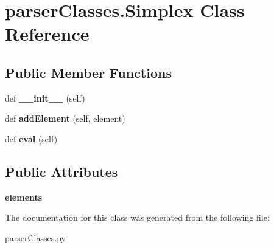\hypertarget{classparser_classes_1_1_simplex}{}\section{parser\+Classes.\+Simplex Class Reference}
\label{classparser_classes_1_1_simplex}
\subsection*{Public Member Functions}
\begin{DoxyCompactItemize}
\item 
def {\bfseries \+\_\+\+\_\+init\+\_\+\+\_\+} (self)\hypertarget{classparser_classes_1_1_simplex_ae0d244c9cd73a6ccb9fe38a5e2045818}{}\label{classparser_classes_1_1_simplex_ae0d244c9cd73a6ccb9fe38a5e2045818}

\item 
def {\bfseries add\+Element} (self, element)\hypertarget{classparser_classes_1_1_simplex_ab4f047be45ac43f11b9fb18691ca1413}{}\label{classparser_classes_1_1_simplex_ab4f047be45ac43f11b9fb18691ca1413}

\item 
def {\bfseries eval} (self)\hypertarget{classparser_classes_1_1_simplex_adbbb7c22025953fc0690e4bcd22ce4cc}{}\label{classparser_classes_1_1_simplex_adbbb7c22025953fc0690e4bcd22ce4cc}

\end{DoxyCompactItemize}
\subsection*{Public Attributes}
\begin{DoxyCompactItemize}
\item 
{\bfseries elements}\hypertarget{classparser_classes_1_1_simplex_a20765598c2e5bc570cc0ea135920d4ea}{}\label{classparser_classes_1_1_simplex_a20765598c2e5bc570cc0ea135920d4ea}

\end{DoxyCompactItemize}


The documentation for this class was generated from the following file\+:\begin{DoxyCompactItemize}
\item 
parser\+Classes.\+py\end{DoxyCompactItemize}
